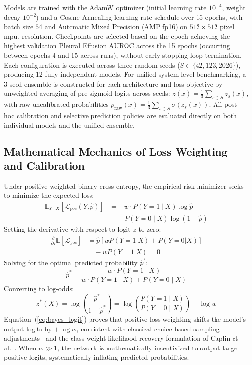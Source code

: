 \documentclass[journal]{IEEEtran}
\begin{document}
Models are trained with the AdamW optimizer (initial learning rate $10^{-4}$, weight decay $10^{-2}$) and a Cosine Annealing learning rate schedule over 15 epochs, with batch size 64 and Automatic Mixed Precision (AMP fp16) on $512 \times 512$ pixel input resolution. Checkpoints are selected based on the epoch achieving the highest validation Pleural Effusion AUROC across the 15 epochs (occurring between epochs 4 and 15 across runs), without early stopping loop termination. Each configuration is executed across three random seeds ($S \in \{42, 123, 2026\}$), producing 12 fully independent models. For unified system-level benchmarking, a 3-seed ensemble is constructed for each architecture and loss objective by unweighted averaging of pre-sigmoid logits across seeds: $\bar{z}(x) = \frac{1}{3}\sum_{s \in S} z_s(x)$, with raw uncalibrated probabilities $\bar{p}_{\text{raw}}(x) = \frac{1}{3}\sum_{s \in S} \sigma(z_s(x))$. All post-hoc calibration and selective prediction policies are evaluated directly on both individual models and the unified ensemble.

\subsection{Mathematical Mechanics of Loss Weighting and Calibration}
Under positive-weighted binary cross-entropy, the empirical risk minimizer seeks to minimize the expected loss:
\begin{align}
\mathbb{E}_{Y \mid X} [\mathcal{L}_{\text{pos}}(Y, \hat{p})] &= - w \cdot P(Y=1 \mid X) \log \hat{p} \nonumber \\
&\quad - P(Y=0 \mid X) \log(1 - \hat{p})
\end{align}
Setting the derivative with respect to logit $z$ to zero:
\begin{align}
\frac{\partial}{\partial z} \mathbb{E}[\mathcal{L}_{\text{pos}}] &= \hat{p} \left[ w P(Y=1|X) + P(Y=0|X) \right] \nonumber \\
&\quad - w P(Y=1|X) = 0
\end{align}
Solving for the optimal predicted probability $\hat{p}^*$:
\begin{equation}
\hat{p}^* = \frac{w \cdot P(Y=1 \mid X)}{w \cdot P(Y=1 \mid X) + P(Y=0 \mid X)}
\end{equation}
Converting to log-odds:
\begin{equation}
z^*(X) = \log\left(\frac{\hat{p}^*}{1 - \hat{p}^*}\right) = \log\left(\frac{P(Y=1 \mid X)}{P(Y=0 \mid X)}\right) + \log w
\label{eq:bayes_logit}
\end{equation}
Equation~(\ref{eq:bayes_logit}) proves that positive loss weighting shifts the model's output logits by $+\log w$, consistent with classical choice-based sampling adjustments~\cite{king2001logistic} and the class-weight likelihood recovery formulation of Caplin et al.~\cite{caplin2022calibrating}. When $w \gg 1$, the network is mathematically incentivized to output large positive logits, systematically inflating predicted probabilities.
\end{document}
